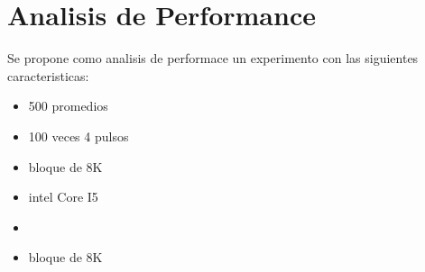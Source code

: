 \section{Analisis de Performance}


Se propone como analisis de performace un experimento con las siguientes caracteristicas:

\begin{itemize}
\item 500 promedios
\item 100 veces 4 pulsos 
\item bloque de 8K
\end{itemize}

\begin{itemize}
    \item intel Core I5
    \item  
    \item bloque de 8K
 \end{itemize}
    



\newpage